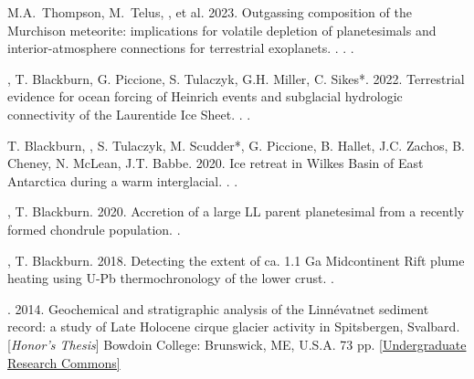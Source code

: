 \begin{etaremune} [itemsep=4pt, leftmargin=3ex]
    \item M.A.~Thompson, M.~Telus, \ghedwards, et al. 2023. Outgassing composition of the Murchison meteorite: implications for volatile depletion of planetesimals and interior-atmosphere connections for terrestrial exoplanets. . . .
    
    \item \ghedwards, T. Blackburn, G. Piccione, S. Tulaczyk, G.H. Miller, C. Sikes*. 2022. Terrestrial evidence for ocean forcing of Heinrich events and subglacial hydrologic connectivity of the Laurentide Ice Sheet. . .
    
    \item T. Blackburn, \ghedwards, S. Tulaczyk, M. Scudder*, G. Piccione, B. Hallet, J.C. Zachos, B. Cheney, N. McLean, J.T. Babbe. 2020. Ice retreat in Wilkes Basin of East Antarctica during a warm interglacial. . . 
    
    \item \ghedwards, T. Blackburn. 2020. Accretion of a large LL parent planetesimal from a recently formed chondrule population. . 
    
    \item \ghedwards, T. Blackburn. 2018. Detecting the extent of ca. 1.1 Ga Midcontinent Rift plume heating using U-Pb thermochronology of the lower crust. .  
    
    \item \ghedwards. 2014. Geochemical and stratigraphic analysis of the Linnévatnet sediment record: a study of Late Holocene cirque glacier activity in Spitsbergen, Svalbard. [\textit{Honor’s Thesis}] Bowdoin College: Brunswick, ME, U.S.A. 73 pp. \href{https://digitalcommons.bowdoin.edu/honorsprojects/12/}{[Undergraduate Research Commons]}

\end{etaremune}